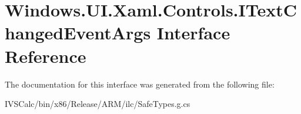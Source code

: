 \hypertarget{interface_windows_1_1_u_i_1_1_xaml_1_1_controls_1_1_i_text_changed_event_args}{}\section{Windows.\+U\+I.\+Xaml.\+Controls.\+I\+Text\+Changed\+Event\+Args Interface Reference}
\label{interface_windows_1_1_u_i_1_1_xaml_1_1_controls_1_1_i_text_changed_event_args}


The documentation for this interface was generated from the following file\+:\begin{DoxyCompactItemize}
\item 
I\+V\+S\+Calc/bin/x86/\+Release/\+A\+R\+M/ilc/Safe\+Types.\+g.\+cs\end{DoxyCompactItemize}
